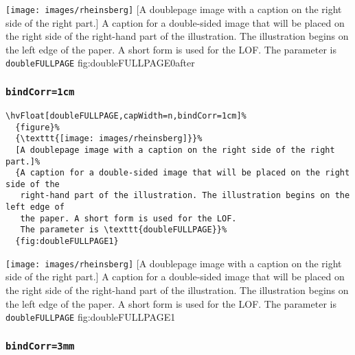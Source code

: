 \documentclass[twoside]{scrartcl}
\makeatletter
\let\hvBlindtext\Blindtext
\def\Blindtext{\par\color{black!40}\hvBlindtext\par\normalcolor}
\def\hvblindtext{\textcolor{black!40}{\blindtext@text}}
\makeatother
\begin{document}
%
  {\texttt{[image: images/rheinsberg]}}%
  [A doublepage image with a caption on the right side of the right part.]%
  {A caption for a double-sided image that will be placed on the right side of the
   right-hand part of the illustration. The illustration begins on the left edge of 
   the paper. A short form is used for the LOF. 
   The parameter is \texttt{doubleFULLPAGE}}%
  {fig:doubleFULLPAGE0after}

\Blindtext

\hvblindtext

\hvblindtext


\subsubsection{\texttt{bindCorr=1cm}}

\begin{lstlisting}
\hvFloat[doubleFULLPAGE,capWidth=n,bindCorr=1cm]%
  {figure}%
  {\texttt{[image: images/rheinsberg]}}%
  [A doublepage image with a caption on the right side of the right part.]%
  {A caption for a double-sided image that will be placed on the right side of the
   right-hand part of the illustration. The illustration begins on the left edge of 
   the paper. A short form is used for the LOF. 
   The parameter is \texttt{doubleFULLPAGE}}%
  {fig:doubleFULLPAGE1}
\end{lstlisting}

%
  {\texttt{[image: images/rheinsberg]}}%
  [A doublepage image with a caption on the right side of the right part.]%
  {A caption for a double-sided image that will be placed on the right side of the
   right-hand part of the illustration. The illustration begins on the left edge of 
   the paper. A short form is used for the LOF. 
   The parameter is \texttt{doubleFULLPAGE}}%
  {fig:doubleFULLPAGE1}

\hvblindtext

\Blindtext

\Blindtext

\Blindtext

\subsubsection{\texttt{bindCorr=3mm}}
\end{document}
